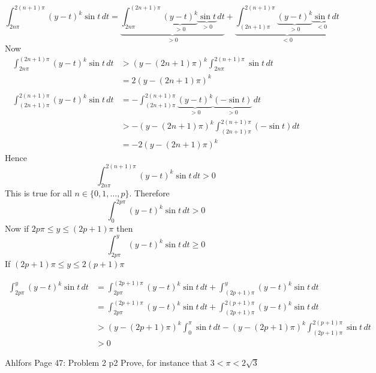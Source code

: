 \documentclass[a4paper, 11pt]{article}
\begin{document}
{	$$
		\int_{2n\pi}^{2(n+1)\pi} (y-t)^k\sin t\,dt = \underbrace{\int_{2n\pi}^{(2n+1)\pi} \underbrace{(y-t)^k}_{>0}\underbrace{\sin t}_{>0}\,dt}_{>0}+\underbrace{\int^{2(n+1)\pi}_{(2n+1)\pi} \underbrace{(y-t)^k}_{>0}\underbrace{\sin t}_{<0}\,dt}_{<0}$$Now \begin{align*}
			\int_{2n\pi}^{(2n+1)\pi} {(y-t)^k}{\sin t}\,dt & > (y-(2n+1)\pi)^k\int^{2(n+1)\pi}_{2n\pi}\sin t\, dt\\
			&= 2 (y-(2n+1)\pi)^k\\ 
			\\
			\int^{2(n+1)\pi}_{(2n+1)\pi} {(y-t)^k}{\sin t}\,dt & =-\int^{2(n+1)\pi}_{(2n+1)\pi} \underbrace{(y-t)^k}_{>0}\underbrace{(-\sin t)}_{>0}\,dt\\ &>-(y-(2n+1)\pi)^k\int^{2(n+1)\pi}_{(2n+1)\pi}(-\sin t)dt\\
			& = -2(y-(2n+1)\pi)^k
	\end{align*}Hence $$	\int_{2n\pi}^{2(n+1)\pi} (y-t)^k\sin t\,dt>0$$This is true for all $n\in \{0,1,\dots,p\}$. Therefore $$\int_0^{2p\pi} (y-t)^k \sin t\, dt > 0$$Now if $2p\pi\leq y\leq (2p+1)\pi$ then $$\int_{2p\pi}^y (y-t)^k\sin t\,dt\geq 0$$If $(2p+1)\pi\leq y\leq 2(p+1)\pi$
	
	\begin{align*}
		\int_{2p\pi}^y (y-t)^k\sin t\,dt &= \int_{2p\pi}^{(2p+1)\pi}(y-t)^k\sin t\,dt + \int_{(2p+1)\pi}^y(y-t)^k\sin t\,dt\\
		&= \int_{2p\pi}^{(2p+1)\pi}(y-t)^k\sin t\,dt + \int_{(2p+1)\pi}^{2(p+1)\pi}(y-t)^k\sin t\,dt\\
		&> (y-(2p+1)\pi)^k \int_0^\pi\sin t\,dt - (y-(2p+1)\pi)^k\int_{(2p+1)\pi}^{2(p+1)\pi}\sin t\,dt\\
		&> 0
	\end{align*}
		
	}
	
	
	
	\begin{problem}{%
			Ahlfors Page 47: Problem 2
		}{p2%
		}
		Prove, for instance that $3<\pi< 2\sqrt{3}$
	\end{problem}
	
\end{document}
